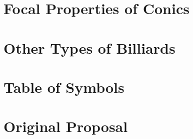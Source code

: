 \documentclass{amsbook}
\begin{document}
\section{Focal Properties of Conics}
\label{app:focal}


\section{Other Types of Billiards}
\label{app:other-billiards}


\section{Table of Symbols}
\label{app:symbols}


\section{Original Proposal}




\end{document}

